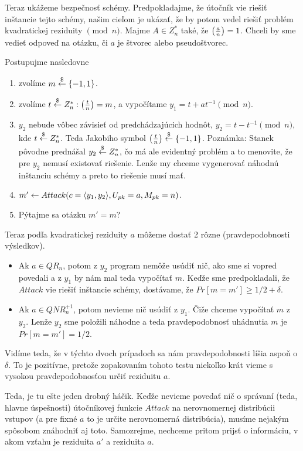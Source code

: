 \medskip
Teraz ukážeme bezpečnosť schémy. Predpokladajme, že útočník vie riešiť
inštancie tejto schémy, našim cieľom je ukázať, že by potom vedel
riešiť problém kvadratickej reziduity $\pmod{n}$.
Majme $A \in Z_n^*$ také, že $\left( \frac{a}{n} \right)=1$. Chceli by sme vedieť
odpoveď na otázku, či $a$ je štvorec alebo pseudoštvorec.

Postupujme nasledovne
\begin{enumerate}
    \item zvolíme $m \overset{\$}{\leftarrow} \{-1,1\}$.
    \item zvolíme $t \overset{\$}{\leftarrow} Z_n^*: \left( \frac{t}{n} \right)=m$, a vypočítame
        $y_1 = t + a t^{-1} \pmod{n}$.
    \item $y_2$ nebude vôbec závisieť od predchádzajúcich hodnôt,
            $y_2 = t -  t^{-1} \pmod{n}$, kde $t \overset{\$}{\leftarrow} Z_n^*$.
            Teda Jakobiho symbol $\left( \frac{t}{n} \right) \overset{\$}{\leftarrow} \{-1,1\}$.
            Poznámka: Stanek pôvodne prednášal $y_2 \overset{\$}{\leftarrow} Z_n^*$,
            čo má ale evidentný problém a to menovite, že pre $y_2$
            nemusí existovať riešenie. Lenže my chceme vygenerovať
            náhodnú inštanciu schémy a preto to riešenie musí mať.
    \item $m' \leftarrow Attack(c=\langle y_1, y_2 \rangle, U_{pk}=a,M_{pk}=n)
            $.
    \item Pýtajme sa otázku $m'=m$?
\end{enumerate}
Teraz podľa kvadratickej reziduity $a$ môžeme dostať 2 rôzne
(pravdepodobnosti výsledkov).
\begin{itemize}
    \item Ak $a \in QR_{n}$, potom z $y_2$ program nemôže usúdiť nič,
    ako sme si vopred povedali a z $y_1$ by nám mal teda vypočítať
    $m$. Keďže sme predpokladali, že $Attack$ vie riešiť inštancie
    schémy, dostávame, že $Pr[m=m'] \ge 1/2 + \delta$.

    \item Ak $a \in QNR_{n}^{+1}$, potom nevieme nič usúdiť z $y_1$.
    Čiže chceme vypočítať $m$ z $y_2$. Lenže $y_2$ sme položili
    náhodne a teda pravdepodobnosť uhádnutia $m$ je $Pr[m=m'] = 1/2$.
\end{itemize}
Vidíme teda, že v týchto dvoch prípadoch sa nám pravdepodobnosti líšia
aspoň o $\delta$. To je pozitívne, pretože zopakovaním tohoto testu
niekoľko krát vieme s vysokou pravdepodobnosťou určiť reziduitu $a$.

Teda, je tu ešte jeden drobný háčik. Keďže nevieme povedať nič o
správaní (teda, hlavne úspešnosti) útočníkovej funkcie $Attack$
na nerovnomernej distribúcii vstupov (a pre fixné $a$ to je určite
nerovnomerná distribúcia), musíme nejakým spôsobom znáhodniť aj toto.
Samozrejme, nechceme pritom prijsť o informáciu, v akom vzťahu je
reziduita $a'$ a reziduita $a$.

